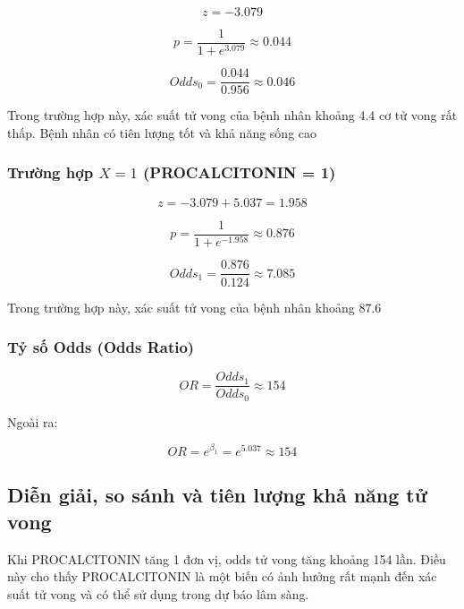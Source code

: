 \[
z = -3.079
\]

\[
p = \frac{1}{1 + e^{3.079}} \approx 0.044
\]

\[
Odds_0 = \frac{0.044}{0.956} \approx 0.046
\]

Trong trường hợp này, xác suất tử vong của bệnh nhân khoảng 4.4%
cơ tử vong rất thấp. Bệnh nhân có tiên lượng tốt và khả năng sống cao
\subsubsection{Trường hợp $X = 1$ (PROCALCITONIN = 1)}

\[
z = -3.079 + 5.037 = 1.958
\]

\[
p = \frac{1}{1 + e^{-1.958}} \approx 0.876
\]

\[
Odds_1 = \frac{0.876}{0.124} \approx 7.085
\]

Trong trường hợp này, xác suất tử vong của bệnh nhân khoảng 87.6%

\subsubsection{Tỷ số Odds (Odds Ratio)}

\[
OR = \frac{Odds_1}{Odds_0} \approx 154
\]

Ngoài ra:

\[
OR = e^{\beta_1} = e^{5.037} \approx 154
\]


\subsection{Diễn giải, so sánh và tiên lượng khả năng tử vong}

Khi PROCALCITONIN tăng 1 đơn vị, odds tử vong tăng khoảng 154 lần. 
Điều này cho thấy PROCALCITONIN là một biến có ảnh hưởng rất mạnh đến xác suất tử vong và có thể sử dụng trong dự báo lâm sàng.

